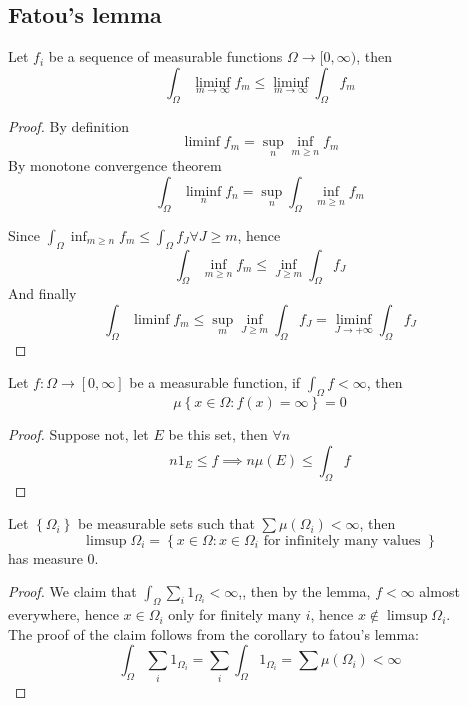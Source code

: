 \documentclass[../main.tex]{subfiles}
\begin{document}
\subsection{Fatou's lemma}
\begin{thm}
Let $f_i$ be a sequence of measurable functions $\Omega \to [ 0, \infty ) $, then
\[ 
\int_{ \Omega }^{  }\liminf_{ m\to \infty } f_m \leq \liminf_{m \to \infty } \int_{ \Omega }^{  }f_m
\]

\end{thm}
\begin{proof}
By definition
\[ 
\liminf f_m = \sup_n \inf_{m \geq n} f_m
\]
By monotone convergence theorem
\[ 
\int_{ \Omega }^{  } \liminf_{n} f_n = \sup_n \int_{ \Omega  }^{  }\inf_{m \geq n} f_m 
\]

Since $ \int_{ \Omega }^{  }\inf_{m \geq n} f_m \leq  \int_{\Omega} f_J \forall J \geq m$, hence
\[ 
\int_{ \Omega  }^{  }\inf_{m \geq n} f_m \leq  \inf_{ J \geq m} \int_{ \Omega }^{  } f_J
\]
And finally
\[ 
\int_{ \Omega }^{  } \liminf f_m \leq \sup_m \inf_{J \geq m} \int_{ \Omega }^{  }f_J = \liminf_{J \to  + \infty} \int_{\Omega} f_J
\]
\end{proof}
\begin{lemma}
Let $f:\Omega\to [ 0, \infty ] $ be a measurable function, if $ \int_{ \Omega }^{  }f < \infty $, then 
\[ 
\mu \left\{ x\in \Omega: f( x) = \infty  \right\} =0
\]

\end{lemma}
\begin{proof}
Suppose not, let $E$ be this set, then $\forall n$ 
\[ 
n 1_E \leq f \implies n \mu( E) \leq  \int_\Omega f
\]

\end{proof}
\begin{exemple}
Let $ \left\{ \Omega_i \right\} $ be measurable sets such that $\sum \mu( \Omega_i) < \infty $, then
\[ 
\limsup \Omega_i = \left\{ x\in \Omega: x\in\Omega_i \text{ for infinitely many values }  \right\} 
\]
has measure 0.
\end{exemple}
\begin{proof}
 We claim that $ \int_{ \Omega }^{  }\sum_i 1_{\Omega_i} < \infty $,, then by the lemma, $f< \infty $ almost everywhere, hence $x\in\Omega_i$ only for finitely many $i$, hence $x \notin \limsup \Omega_i$.\\
 The proof of the claim follows from the corollary to fatou's lemma:
 \[ 
 \int_{ \Omega }^{  }\sum_i 1_{\Omega_i} = \sum_i \int_{ \Omega }^{  }1_{\Omega_i} = \sum \mu( \Omega_i) < \infty 
 \]
 
\end{proof}
	

	
	

		
\end{document}
